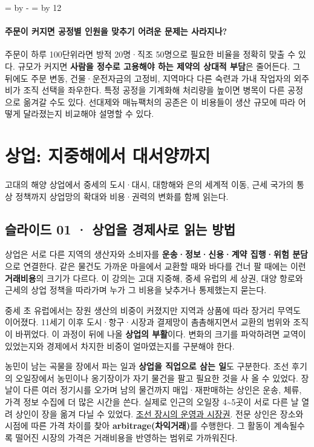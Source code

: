 \documentclass[10pt,a4paper]{article}
\newcommand{\ReserveQuestionSpace}{%
  \par\begingroup
  \dimen0=\pagegoal \advance\dimen0 by -\pagetotal
  \dimen2=\baselineskip \multiply\dimen2 by 12
  \ifdim\dimen0<\dimen2 \newpage\fi
  \endgroup}
\begin{document}
\ReserveQuestionSpace
\paragraph{주문이 커지면 공정별 인원을 맞추기 어려운 문제는 사라지나?}
주문이 하루 100단위라면 방적 20명·직조 50명으로 필요한 비율을 정확히 맞출 수 있다. 규모가 커지면 \textbf{사람을 정수로 고용해야 하는 제약의 상대적 부담}은 줄어든다. 그 뒤에도 주문 변동, 건물·운전자금의 고정비, 지역마다 다른 숙련과 가내 작업자의 외주비가 조직 선택을 좌우한다. 특정 공정을 기계화해 처리량을 높이면 병목이 다른 공정으로 옮겨갈 수도 있다. 선대제와 매뉴팩처의 공존은 이 비용들이 생산 규모에 따라 어떻게 달라졌는지 비교해야 설명할 수 있다.\par

\section{상업: 지중해에서 대서양까지}
고대의 해양 상업에서 중세의 도시·대시, 대항해와 은의 세계적 이동, 근세 국가의 통상 정책까지 상업망의 확대와 비용·권력의 변화를 함께 읽는다.\par

\subsection{슬라이드 01 · 상업을 경제사로 읽는 방법}
상업은 서로 다른 지역의 생산자와 소비자를 \textbf{운송·정보·신용·계약 집행·위험 분담}으로 연결한다. 같은 물건도 가까운 마을에서 교환할 때와 바다를 건너 팔 때에는 이런 \textbf{거래비용}의 크기가 다르다. 이 강의는 고대 지중해, 중세 유럽의 세 상권, 대양 항로와 근세의 상업 정책을 따라가며 누가 그 비용을 낮추거나 통제했는지 묻는다.\par

중세 초 유럽에서는 장원 생산의 비중이 커졌지만 지역과 상품에 따라 장거리 무역도 이어졌다. 11세기 이후 도시·항구·시장과 결제망이 촘촘해지면서 교환의 범위와 조직이 바뀌었다. 이 과정이 뒤에 나올 \textbf{상업의 부활}이다. 변화의 크기를 파악하려면 교역이 있었는지와 경제에서 차지한 비중이 얼마였는지를 구분해야 한다.\par

농민이 남는 곡물을 장에서 파는 일과 \textbf{상업을 직업으로 삼는 일}도 구분한다. 조선 후기의 오일장에서 농민이나 옹기장이가 자기 물건을 팔고 필요한 것을 사 올 수 있었다. 장날이 다른 여러 정기시를 오가며 남의 물건까지 매입·재판매하는 상인은 운송, 체류, 가격 정보 수집에 더 많은 시간을 쓴다. 실제로 인근의 오일장 4\textasciitilde{}5곳이 서로 다른 날 열려 상인이 장을 옮겨 다닐 수 있었다. \href{https://encykorea.aks.ac.kr/Article/E0048454}{조선 장시의 운영과 시장권}. 전문 상인은 장소와 시점에 따른 가격 차이를 찾아 \textbf{arbitrage(차익거래)}를 수행한다. 그 활동이 계속될수록 떨어진 시장의 가격은 거래비용을 반영하는 범위로 가까워진다.\par
\end{document}
